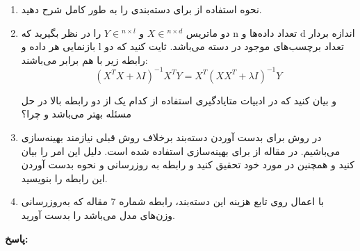 \documentclass{article}
\begin{document}
\begin{enumerate}
	\item
	نحوه استفاده از 
	برای دسته‌بندی را به طور کامل شرح دهید.
	\item
	دو ماتریس
	$X \in {^{n \times d}}$
	و
	$Y \in {^{n \times l}}$
	را در نظر بگیرید که n تعداد داده‌ها و d اندازه بردار باز‌نمایی هر داده و l تعداد برچسب‌های موجود در دسته می‌باشد. ثایت کنید که دو رابطه زیر با هم برابر می‌باشند:
	$$
	{\left( {{X^T}X + \lambda I} \right)^{ - 1}}{X^T}Y = {X^T}{\left( {X{X^T} + \lambda I} \right)^{ - 1}}Y
	$$
	
	و بیان کنید که در ادبیات متایادگیری استفاده از کدام یک از دو رابطه بالا در حل مسئله بهتر می‌باشد و چرا؟
	\\
	
	\item
	در روش
	برای بدست آوردن دسته‌بند برخلاف روش قبلی نیازمند بهینه‌سازی می‌باشیم. در مقاله از
	برای بهینه‌سازی استفاده شده است. دلیل این امر را بیان کنید و همچنین در مورد خود
	تحقیق کنید و رابطه به روزرسانی و نحوه بدست آوردن این رابطه را بنویسید.
	
	\item
	با اعمال
	روی تابع هزینه این دسته‌بند، رابطه شماره 7 مقاله که به‌روزرسانی وزن‌های مدل می‌باشد را بدست آورید.


\end{enumerate}


\textbf{پاسخ:}
\end{document}
